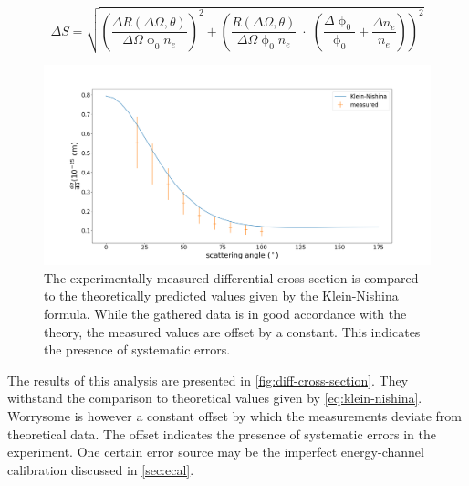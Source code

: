 \begin{equation}
\label{eq:cross-section-error}
	\Delta S = \sqrt{ \left(\frac{\Delta R(\Delta\Omega,\theta)}{\Delta\Omega\upphi_0 n_e} \right)^2 + \left(\frac{R(\Delta\Omega,\theta)}{\Delta\Omega\upphi_0 n_e}\;\cdot\;(\frac{\Delta\upphi_0}{\upphi_0} + \frac{\Delta n_e}{n_e} ) \right)^2 }
\end{equation}

\begin{figure}
	\centering
	\includegraphics[width=1.0\textwidth]{./fig/differential-cross-section.png}
	\caption{The experimentally measured differential cross section is compared
	to the theoretically predicted values given by the Klein-Nishina formula.
	While the gathered data is in good accordance with the theory, the measured
	values are offset by a constant. This indicates the presence of systematic
	errors.}
	\label{fig:diff-cross-section}
\end{figure}

The results of this analysis are presented in \autoref{fig:diff-cross-section}. They
withstand the comparison to theoretical values given by \autoref{eq:klein-nishina}.
Worrysome is however a constant offset by which the measurements deviate from
theoretical data. The offset indicates the presence of systematic errors in the
experiment. One certain error source may be the imperfect energy-channel calibration
discussed in \autoref{sec:ecal}.

